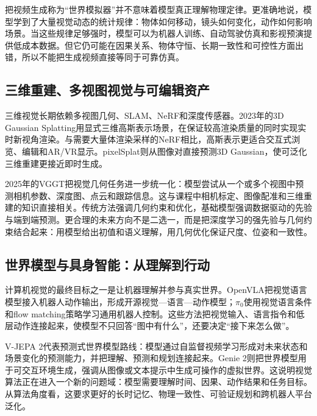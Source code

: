 \documentclass[UTF8,a4paper,12pt]{ctexart}
\newcommand{\model}[1]{\textsf{#1}}
\begin{document}
把视频生成称为“世界模拟器”并不意味着模型真正理解物理定律。更准确地说，模型学到了大量视觉动态的统计规律：物体如何移动，镜头如何变化，动作如何影响场景。当这些规律足够强时，模型可以为机器人训练、自动驾驶仿真和影视预演提供低成本数据。但它仍可能在因果关系、物体守恒、长期一致性和可控性方面出错，所以不能把生成视频直接等同于可靠仿真。

\subsection{三维重建、多视图视觉与可编辑资产}
三维视觉长期依赖多视图几何、SLAM、NeRF和深度传感器。2023年的\model{3D Gaussian Splatting}用显式三维高斯表示场景，在保证较高渲染质量的同时实现实时新视角渲染\cite{gs3d}。与需要大量体渲染采样的NeRF相比，高斯表示更适合交互式浏览、编辑和AR/VR显示。\model{pixelSplat}则从图像对直接预测3D Gaussian，使可泛化三维重建更接近即时生成\cite{pixelsplat}。

2025年的\model{VGGT}把视觉几何任务进一步统一化：模型尝试从一个或多个视图中预测相机参数、深度图、点云和跟踪信息\cite{vggt}。这与课程中相机标定、图像配准和三维重建的知识直接相关。传统方法强调几何约束和优化，基础模型强调数据驱动的先验与端到端预测。更合理的未来方向不是二选一，而是把深度学习的强先验与几何约束结合起来：用模型给出初值和语义理解，用几何优化保证尺度、位姿和一致性。

\subsection{世界模型与具身智能：从理解到行动}
计算机视觉的最终目标之一是让机器理解并参与真实世界。\model{OpenVLA}把视觉语言模型接入机器人动作输出，形成开源视觉—语言—动作模型\cite{openvla}；$\pi_0$使用视觉语言条件和flow matching策略学习通用机器人控制\cite{pi0}。这些方法把视觉输入、语言指令和低层动作连接起来，使模型不只回答“图中有什么”，还要决定“接下来怎么做”。

\model{V-JEPA 2}代表预测式世界模型路线：模型通过自监督视频学习形成对未来状态和场景变化的预测能力，并把理解、预测和规划连接起来\cite{vjepa2}。\model{Genie 2}则把世界模型用于可交互环境生成，强调从图像或文本提示中生成可操作的虚拟世界\cite{genie2}。这说明视觉算法正在进入一个新的问题域：模型需要理解时间、因果、动作结果和任务目标。从算法角度看，这要求更好的长时记忆、物理一致性、可验证规划和跨机器人平台泛化。
\end{document}

